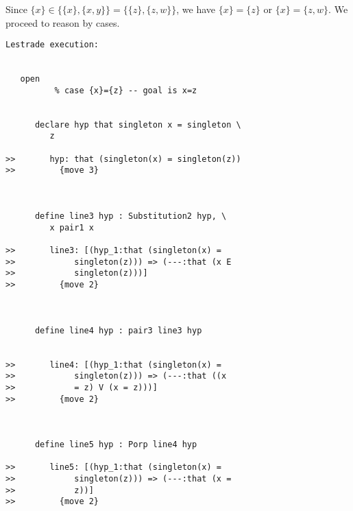 \documentclass{article}
\begin{document}
Since $\{x\} \in \{\{x\},\{x,y\}\}=\{\{z\},\{z,w\}\}$, we have $\{x\}=\{z\}$ or $\{x\} = \{z,w\}$.  We proceed to reason by cases.

\begin{verbatim}Lestrade execution:


   open
          % case {x}={z} -- goal is x=z


      declare hyp that singleton x = singleton \
         z

>>       hyp: that (singleton(x) = singleton(z))
>>         {move 3}



      define line3 hyp : Substitution2 hyp, \
         x pair1 x

>>       line3: [(hyp_1:that (singleton(x) =
>>            singleton(z))) => (---:that (x E
>>            singleton(z)))]
>>         {move 2}



      define line4 hyp : pair3 line3 hyp


>>       line4: [(hyp_1:that (singleton(x) =
>>            singleton(z))) => (---:that ((x
>>            = z) V (x = z)))]
>>         {move 2}



      define line5 hyp : Porp line4 hyp

>>       line5: [(hyp_1:that (singleton(x) =
>>            singleton(z))) => (---:that (x =
>>            z))]
>>         {move 2}


\end{verbatim}
\end{document}
